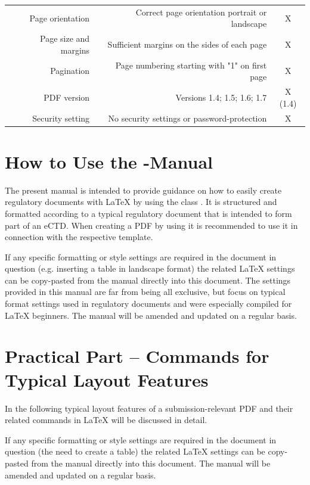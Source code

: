 \begin{table}[htbp]
\begin{tabular}{rrr}
Page orientation & Correct page orientation portrait or landscape & \multicolumn{1}{c}{X} \\
Page size and margins & Sufficient margins on the sides of each page & \multicolumn{1}{c}{X} \\
Pagination & Page numbering starting with "1" on first page & \multicolumn{1}{c}{X} \\
PDF version & Versions 1.4; 1.5; 1.6; 1.7  & \multicolumn{1}{c}{X (1.4)} \\
Security setting & No security settings or password-protection  & \multicolumn{1}{c}{X} \\
\bottomrule
\end{tabular}%
\label{tab:addlabel}%
\end{table}%

\section{How to Use the \PharmRep-Manual}
The present manual is intended to provide guidance on how to easily create regulatory documents with \LaTeX{} by using the class \PharmRep.
It is structured and formatted according to a typical regulatory document that is intended to form part of an eCTD. When creating a PDF by using \PharmRep
it is recommended to use it in connection with the respective \PharmRep template.

If any specific formatting or style settings are required in the document in question (e.g. inserting a table in landscape format) the related \LaTeX{} settings
can be copy-pasted from the manual directly into this document. The settings provided in this manual are far from being all exclusive, but focus on typical format
settings used in regulatory documents and were especially compiled for \LaTeX{} beginners.
The manual will be amended and updated on a regular basis.

\section{Practical Part -- Commands for Typical Layout Features}
In the following typical layout features of a submission-relevant PDF and their related commands in \LaTeX{} will be
discussed in detail.

If any specific formatting or style settings are required in the document in question (\eg the need to
create a table) the related \LaTeX{} settings can be copy-pasted from the manual directly into this document.
The manual will be amended and updated on a regular basis.

